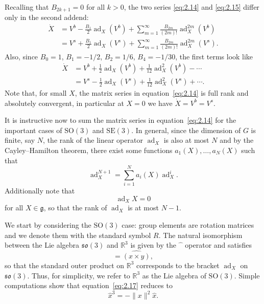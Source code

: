 \documentclass[11pt]{article}
\newcommand{\SO}{\mathrm{SO}}
\newcommand{\SE}{\mathrm{SE}}
\newcommand{\so}{\mathfrak{so}}
\newcommand{\gfrak}{\mathfrak g}
\newcommand{\ad}{\operatorname{ad}}
\newcommand{\R}{\mathbb R}
\begin{document}
Recalling that $B_{2k+1}=0$ for all $k>0$, the two series \eqref{eq:2.14} and \eqref{eq:2.15} differ only in the second addend:
\begin{align*}
\dot X&=V^b-\frac{B_1}{2}\ad_X(V^b)+\sum_{m=1}^{\infty}\frac{B_{2m}}{(2m)!}\ad_X^{2m}(V^b)\\
&=V^s+\frac{B_1}{2}\ad_X(V^s)+\sum_{m=1}^{\infty}\frac{B_{2m}}{(2m)!}\ad_X^{2m}(V^s).
\end{align*}
Also, since $B_0=1$, $B_1=-1/2$, $B_2=1/6$, $B_4=-1/30$, the first terms look like
\begin{align*}
\dot X&=V^b+\frac12\ad_X(V^b)+\frac1{12}\ad_X^2(V^b)-\cdots\\
&=V^s-\frac12\ad_X(V^s)+\frac1{12}\ad_X^2(V^s)+\cdots.
\end{align*}
Note that, for small $X$, the matrix series in equation~\eqref{eq:2.14} is full rank and absolutely convergent, in particular at $X=0$ we have $\dot X=V^b=V^s$.

It is instructive now to sum the matrix series in equation~\eqref{eq:2.14} for the important cases of $\SO(3)$ and $\SE(3)$. In general, since the dimension of $G$ is finite, say $N$, the rank of the linear operator $\ad_X$ is also at most $N$ and by the Cayley--Hamilton theorem, there exist some functions $a_1(X),\ldots,a_N(X)$ such that
\begin{equation*}
\ad_X^{N+1}=\sum_{i=1}^N a_i(X)\ad_X^i.\tag{2.17}\label{eq:2.17}
\end{equation*}
Additionally note that
\begin{equation*}
\ad_XX=0\tag{2.18}\label{eq:2.18}
\end{equation*}
for all $X\in\gfrak$, so that the rank of $\ad_X$ is at most $N-1$.

We start by considering the $\SO(3)$ case: group elements are rotation matrices and we denote them with the standard symbol $R$. The natural isomorphism between the Lie algebra $\so(3)$ and $\R^3$ is given by the $\widehat{\phantom{x}}$ operator and satisfies
\begin{equation*}
[\widehat x,\widehat y]=\widehat{(x\times y)},
\end{equation*}
so that the standard outer product on $\R^3$ corresponds to the bracket $\ad_X$ on $\so(3)$. Thus, for simplicity, we refer to $\R^3$ as the Lie algebra of $\SO(3)$. Simple computations show that equation~\eqref{eq:2.17} reduces to
\begin{equation*}
\widehat x^3=-\|x\|^2\widehat x.\tag{2.19}\label{eq:2.19}
\end{equation*}
\end{document}

